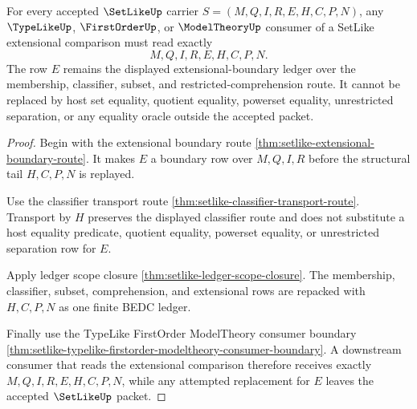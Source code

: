 \begin{theorem}
\label{thm:setlike-extensional-boundary-consumer-exactness}
For every accepted $\SetLikeUp$ carrier $S=(M,Q,I,R,E,H,C,P,N)$, any $\TypeLikeUp$, $\FirstOrderUp$, or $\ModelTheoryUp$ consumer of a SetLike extensional comparison must read exactly
$$
M,Q,I,R,E,H,C,P,N .
$$
The row $E$ remains the displayed extensional-boundary ledger over the membership, classifier, subset, and restricted-comprehension route. It cannot be replaced by host set equality, quotient equality, powerset equality, unrestricted separation, or any equality oracle outside the accepted packet.
\end{theorem}
\begin{proof}
Begin with the extensional boundary route \autoref{thm:setlike-extensional-boundary-route}. It makes $E$ a boundary row over $M,Q,I,R$ before the structural tail $H,C,P,N$ is replayed.

Use the classifier transport route \autoref{thm:setlike-classifier-transport-route}. Transport by $H$ preserves the displayed classifier route and does not substitute a host equality predicate, quotient equality, powerset equality, or unrestricted separation row for $E$.

Apply ledger scope closure \autoref{thm:setlike-ledger-scope-closure}. The membership, classifier, subset, comprehension, and extensional rows are repacked with $H,C,P,N$ as one finite BEDC ledger.

Finally use the TypeLike FirstOrder ModelTheory consumer boundary \autoref{thm:setlike-typelike-firstorder-modeltheory-consumer-boundary}. A downstream consumer that reads the extensional comparison therefore receives exactly $M,Q,I,R,E,H,C,P,N$, while any attempted replacement for $E$ leaves the accepted $\SetLikeUp$ packet.
\end{proof}



